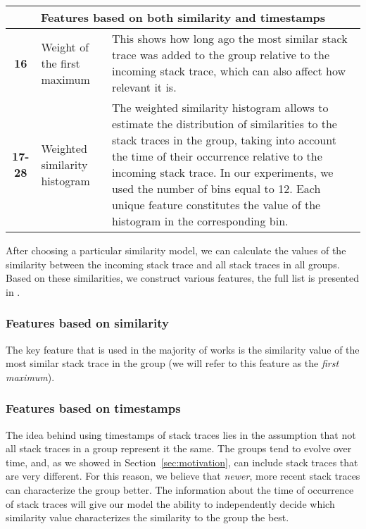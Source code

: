 \begin{table*}[]
\begin{tabular}{cp{4cm}p{12cm}}
  \multicolumn{3}{c}{\textbf{Features based on both similarity and timestamps}}\\\midrule\midrule
  
  \textbf{16} & Weight of the first maximum & This shows how long ago the most similar stack trace was added to the group relative to the incoming stack trace, which can also affect how relevant it is.
  \\ \midrule
  
  \textbf{17-28} & Weighted similarity histogram & The weighted similarity histogram allows to estimate the distribution of similarities to the stack traces in the group, taking into account the time of their occurrence relative to the incoming stack trace. In our experiments, we used the number of bins equal to 12. Each unique feature constitutes the value of the histogram in the corresponding bin. 
  \\ \bottomrule
\end{tabular}
\label{table:features-description}
\end{table*}

After choosing a particular similarity model, we can calculate the values of the similarity between the incoming stack trace and all stack traces in all groups. Based on these similarities, we construct various features, the full list is presented in .

\subsubsection{Features based on similarity}
The key feature that is used in the majority of works is the similarity value of the most similar stack trace in the group (we will refer to this feature as the \textit{first maximum}). 

\subsubsection{Features based on timestamps}

The idea behind using timestamps of stack traces lies in the assumption that not all stack traces in a group represent it the same. The groups tend to evolve over time, and, as we showed in Section~\ref{sec:motivation}, can include stack traces that are very different. For this reason, we believe that \textit{newer}, more recent stack traces can characterize the group better.
The information about the time of occurrence of stack traces will give our model the ability to independently decide which similarity value characterizes the similarity to the group the best.

